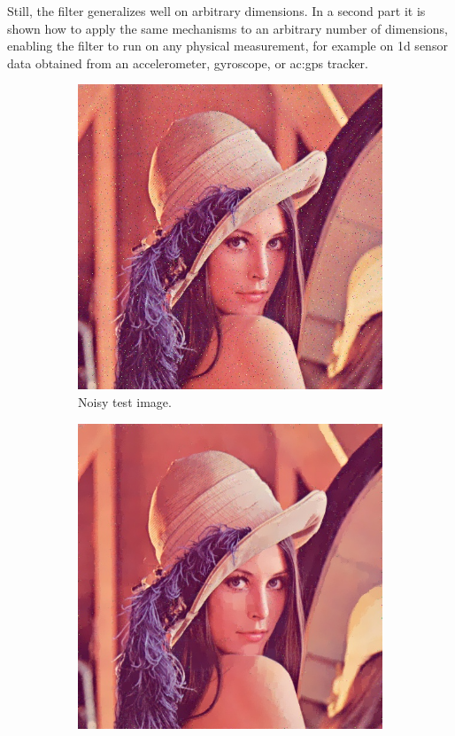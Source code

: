 Still, the filter generalizes well on arbitrary dimensions.
In a second part it is shown how to apply the same mechanisms to an arbitrary number of dimensions, enabling the filter to run on any physical measurement, for example on 1d sensor data obtained from an accelerometer, gyroscope, or \gls{ac:gps} tracker.

\begin{figure}
    \centering
    \begin{subfigure}[]{0.475\textwidth}
        \includegraphics[width=\textwidth]{./figures/sensor/introduction_lena_noisy.jpg}
        \caption{Noisy test image.}
        \label{fig:sensor_introduction_lena_noisy}
    \end{subfigure}\hfill%
    \begin{subfigure}[]{0.475\textwidth}
        \includegraphics[width=\textwidth]{./figures/sensor/introduction_lena_edgefilter.jpg}

\end{subfigure}
\end{figure}
